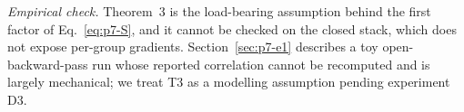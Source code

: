 \emph{Empirical check.} Theorem~3 is the load-bearing assumption behind the
first factor of Eq.~\eqref{eq:p7-S}, and it cannot be checked on the closed
stack, which does not expose per-group gradients. Section~\ref{sec:p7-e1}
describes a toy open-backward-pass run whose reported correlation cannot be
recomputed and is largely mechanical; we treat T3 as a modelling assumption
pending experiment D3.
